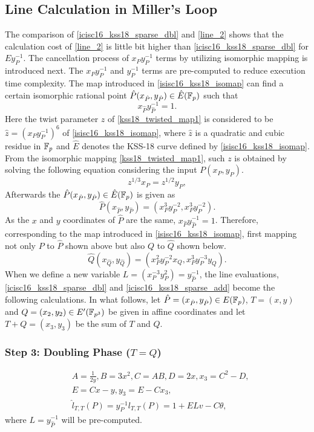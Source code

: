 \subsection{Line Calculation in Miller's Loop} 
The comparison of \eqref{icisc16_kss18_sparse_dbl} and \eqref{line_2} shows that the calculation cost of \eqref{line_2} is little bit higher than \eqref{icisc16_kss18_sparse_dbl} for $Ey_P^{-1}$. The  cancellation process of $x_Py_P^{-1}$ terms by utilizing isomorphic mapping is introduced next. The $x_Py_P^{-1}$ and $y_P^{-1}$ terms are pre-computed to reduce execution time complexity.
The map introduced in \eqref{isisc16_kss18_isomap} can find a certain isomorphic rational point $\hat{P}(x_{\hat{P}},y_{\hat{P}})\in \hat{E}({\mathbb{F}}_{p})$ such that
\begin{equation}
	x_{\hat{P}}y_{\hat{P}}^{-1}=1.
\end{equation}
Here the twist parameter $z$ of  \eqref{kss18_twisted_map1} is considered to be $\hat{z}=(x_Py_P^{-1})^6$ of \eqref{isisc16_kss18_isomap}, where $\hat{z}$ is a quadratic and cubic residue in ${\mathbb{F}}_{p}$ and $\hat{E}$ denotes the KSS-18 curve defined by  \eqref{isisc16_kss18_isomap}. From the isomorphic mapping \eqref{kss18_twisted_map1}, such $z$ is obtained by solving the following equation considering the input $P(x_P,y_P)$.
\begin{equation}
	z^{1/3}x_P=z^{1/2}y_P,
\end{equation}
Afterwards the $\hat{P}(x_{\hat{P}},y_{\hat{P}})\in \hat{E}({\mathbb{F}}_{p})$ is given as
\begin{equation}
	\hat{P}(x_{\hat{P}},y_{\hat{P}})=(x_P^3y_P^{-2},x_P^3y_P^{-2}).
\end{equation}
As the $x$ and $y$ coordinates of $\hat{P}$ are the same, $x_{\hat{P}}y_{\hat{P}}^{-1}=1$. Therefore, corresponding to the map introduced in \eqref{isisc16_kss18_isomap}, first mapping not only $P$ to $\hat{P}$ shown above but also $Q$ to $\hat{Q}$ shown below.
\begin{equation}
	\hat{Q}(x_{\hat{Q}},y_{\hat{Q}})=(x_P^2y_P^{-2}x_Q,x_P^3y_P^{-3}y_Q).
\end{equation}
When we define a new variable $L=(x_P^{-3}y_P^2)=y_{\hat{P}}^{-1}$, the line evaluations, \eqref{icisc16_kss18_sparse_dbl} and \eqref{icisc16_kss18_sparse_add} become the following calculations.
In what follows, let $\hat{P}=(x_{\hat{P}},y_{\hat{P}})\in E({\mathbb{F}}_{p})$, $T=(x,y)$ and $Q=(x_2,y_2)\in E'(\mathbb{F}_{p^{3}})$ be given in affine coordinates and let $T+Q=(x_3,y_3)$ be the sum of $T$ and $Q$.
\subsubsection{Step 3: Doubling Phase \texorpdfstring{($T=Q$)}{}}
\begin{eqnarray}
&A=\frac{1}{2y}, B=3x^2, C=AB, D=2x, x_3=C^2-D,\nonumber\\
&E=Cx-y, y_3=E-Cx_3,\nonumber\\
&\hat{l}_{T,T}(P) = y^{-1}_Pl_{T,T}(P)=1+ELv-C\theta,\label{pseudo_dbl}
\end{eqnarray}
where $L=y_{\hat{P}}^{-1}$ will be pre-computed.
